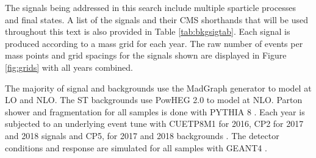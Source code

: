The signals being addressed in this search include multiple sparticle processes and final states. A list of the signals and their CMS shorthands that will be used throughout this text is also provided in Table \ref{tab:bkgsigtab}. Each signal is produced according to a mass grid for each year.  The raw number of events per mass points and grid spacings for the signals shown are displayed in Figure \ref{fig:grids} with all years combined. 


The majority of signal and backgrounds use the MadGraph \cite{Alwall:2011uj} generator to model at LO and NLO. The ST backgrounds use PowHEG 2.0 \cite{Alioli:2010xd} to model at NLO. Parton shower and fragmentation for all samples is done with PYTHIA 8 \cite{Sjostrand:2014zea}. Each year is subjected to an underlying event tune with CUETP8M1 for 2016, CP2 for 2017 and 2018 signals and CP5, for 2017 and 2018 backgrounds \cite{CMS:2015wcf}\cite{CMS:2019csb}. The detector conditions and response are simulated for all samples with GEANT4 \cite{GEANT4:2002zbu}.


